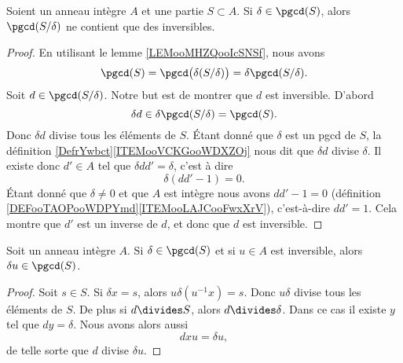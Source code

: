 \begin{lemma}		\label{LEMooZSUNooUmYmgt}
	Soient un anneau intègre \( A\) et une partie \( S\subset A\). Si \( \delta\in\pgcd(S)\), alors \( \pgcd(S/\delta)\) ne contient que des inversibles.
\end{lemma}

\begin{proof}
	En utilisant le lemme \ref{LEMooMHZQooIcSNSf}, nous avons
	\begin{equation}
		\pgcd(S)=\pgcd\big( \delta(S/\delta) \big)=\delta\pgcd(S/\delta).
	\end{equation}
	Soit \( d\in\pgcd(S/\delta)\). Notre but est de montrer que \( d\) est inversible. D'abord
	\begin{equation}
		\delta d\in \delta\pgcd(S/\delta)=\pgcd(S).
	\end{equation}
	Donc \( \delta d\) divise tous les éléments de \( S\). Étant donné que \( \delta\) est un pgcd de \( S\), la définition \ref{DefrYwbct}\ref{ITEMooVCKGooWDXZOj} nous dit que \( \delta d\) divise \( \delta\). Il existe donc \( d'\in A\) tel que \( \delta dd'=\delta\), c'est à dire
	\begin{equation}
		\delta(dd'-1)=0.
	\end{equation}
	Étant donné que \( \delta\neq 0\) et que \( A\) est intègre nous avons \( dd'-1=0\) (définition \ref{DEFooTAOPooWDPYmd}\ref{ITEMooLAJCooFwxXrV}), c'est-à-dire \( dd'=1\). Cela montre que \( d'\) est un inverse de \( d\), et donc que \( d\) est inversible.
\end{proof}

\begin{lemma}		\label{LEMooZKASooKstTuK}
	Soit un anneau intègre \( A\). Si \( \delta\in\pgcd(S)\) et si \( u\in A\) est inversible, alors \( \delta u\in\pgcd(S)\).
\end{lemma}

\begin{proof}
	Soit \( s\in S\). Si \( \delta x=s\), alors \( u\delta (u^{-1} x)=s\). Donc \( u\delta\) divise tous les éléments de \( S\). De plus si \( d\divides S\), alors \( d\divides \delta\). Dans ce cas il existe \( y\) tel que \( dy=\delta\). Nous avons alors aussi
	\begin{equation}
		dxu=\delta u,
	\end{equation}
	de telle sorte que \( d\) divise \( \delta u\).
\end{proof}


